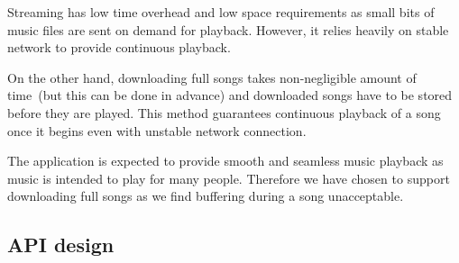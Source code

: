 \par
Streaming has low time overhead and low space requirements as small bits of music files are sent on demand for playback. However, it relies heavily on stable network to provide continuous playback.
\par
On the other hand, downloading full songs takes non-negligible amount of time~(but this can be done in advance) and downloaded songs have to be stored before they are played. This method guarantees continuous playback of a song once it begins even with unstable network connection.
\par
The application is expected to provide smooth and seamless music playback as music is intended to play for many people. Therefore we have chosen to support downloading full songs as we find buffering during a song unacceptable.

\subsection{API design}


